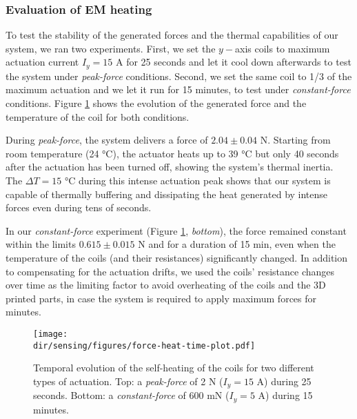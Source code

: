 \subsubsection{Evaluation of EM heating}
To test the stability of the generated forces and the thermal capabilities of our system, we ran two experiments. First, we set the $y-$axis coils to maximum actuation current $I_y = 15$ A for 25 seconds and let it cool down afterwards to test the system under \emph{peak-force} conditions. Second, we set the same coil to 1/3 of the maximum actuation and we let it run for 15 minutes, to test under \emph{constant-force} conditions. Figure \ref{fig:heating} shows the evolution of the generated force and the temperature of the coil for both conditions.

During \emph{peak-force}, the system delivers a force of $2.04 \pm 0.04$ N. Starting from room temperature (24 °C), the actuator heats up to 39 °C but only 40 seconds after the actuation has been turned off, showing the system's thermal inertia. The $\Delta T = 15$ °C during this intense actuation peak shows that our system is capable of thermally buffering and dissipating the heat generated by intense forces even during tens of seconds.

In our \emph{constant-force} experiment (Figure \ref{fig:heating}, \textit{bottom}), the force remained constant within the limits $0.615 \pm 0.015$ N and for a duration of 15 min, even when the temperature of the coils (and their resistances) significantly changed.
In addition to compensating for the actuation drifts, we used the coils' resistance changes over time as the limiting factor to avoid overheating of the coils and the 3D printed parts, in case the system is required to apply maximum forces for minutes.
\begin{figure}[!t]
\centering
\texttt{[image: \\dir/sensing/figures/force-heat-time-plot.pdf]}
\caption{Temporal evolution of the self-heating of the coils for two different types of actuation. Top: a \emph{peak-force} of 2 N ($I_y = 15$ A) during 25 seconds. Bottom: a \emph{constant-force} of 600 mN ($I_y = 5$ A) during 15 minutes.}
\label{fig:heating}
\end{figure}